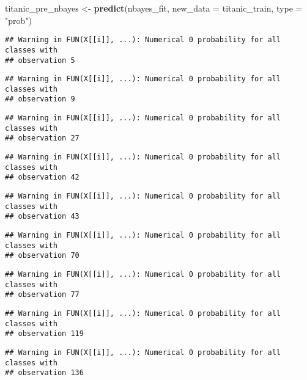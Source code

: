\documentclass[]{article}
\newenvironment{Shaded}{\begin{snugshade}}{\end{snugshade}}
\newcommand{\DataTypeTok}[1]{\textcolor[rgb]{0.13,0.29,0.53}{#1}}
\newcommand{\KeywordTok}[1]{\textcolor[rgb]{0.13,0.29,0.53}{\textbf{#1}}}
\newcommand{\NormalTok}[1]{#1}
\newcommand{\StringTok}[1]{\textcolor[rgb]{0.31,0.60,0.02}{#1}}
\begin{document}
\begin{Shaded}
\begin{Highlighting}[]
\NormalTok{titanic_pre_nbayes <-}\StringTok{ }\KeywordTok{predict}\NormalTok{(nbayes_fit, }\DataTypeTok{new_data =}\NormalTok{ titanic_train, }\DataTypeTok{type =} \StringTok{"prob"}\NormalTok{)}
\end{Highlighting}
\end{Shaded}

\begin{verbatim}
## Warning in FUN(X[[i]], ...): Numerical 0 probability for all classes with
## observation 5
\end{verbatim}

\begin{verbatim}
## Warning in FUN(X[[i]], ...): Numerical 0 probability for all classes with
## observation 9
\end{verbatim}

\begin{verbatim}
## Warning in FUN(X[[i]], ...): Numerical 0 probability for all classes with
## observation 27
\end{verbatim}

\begin{verbatim}
## Warning in FUN(X[[i]], ...): Numerical 0 probability for all classes with
## observation 42
\end{verbatim}

\begin{verbatim}
## Warning in FUN(X[[i]], ...): Numerical 0 probability for all classes with
## observation 43
\end{verbatim}

\begin{verbatim}
## Warning in FUN(X[[i]], ...): Numerical 0 probability for all classes with
## observation 70
\end{verbatim}

\begin{verbatim}
## Warning in FUN(X[[i]], ...): Numerical 0 probability for all classes with
## observation 77
\end{verbatim}

\begin{verbatim}
## Warning in FUN(X[[i]], ...): Numerical 0 probability for all classes with
## observation 119
\end{verbatim}

\begin{verbatim}
## Warning in FUN(X[[i]], ...): Numerical 0 probability for all classes with
## observation 136
\end{verbatim}
\end{document}
